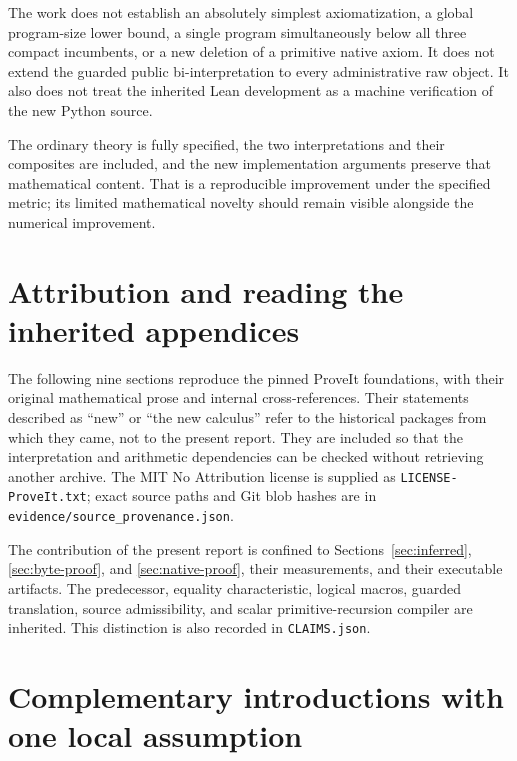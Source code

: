 \documentclass[11pt,letterpaper]{article}
\theoremstyle{definition}
\begin{document}
The work does not establish an absolutely simplest axiomatization,
a global program-size lower bound, a single program simultaneously below
all three compact incumbents, or a new deletion of a primitive native
axiom. It does not extend the guarded public bi-interpretation to every
administrative raw object. It also does not treat the inherited Lean
development as a machine verification of the new Python source.

The ordinary theory is fully specified, the two interpretations and their
composites are included, and the new implementation arguments preserve
that mathematical content. That is a reproducible improvement under the
specified metric; its limited mathematical novelty should remain visible
alongside the numerical improvement.

\clearpage
\appendix
\section{Attribution and reading the inherited appendices}

The following nine sections reproduce the pinned ProveIt foundations,
with their original mathematical prose and internal cross-references.
Their statements described as ``new'' or ``the new calculus'' refer to
the historical packages from which they came, not to the present report.
They are included so that the interpretation and arithmetic dependencies
can be checked without retrieving another archive. The MIT No Attribution
license is supplied as \texttt{LICENSE-ProveIt.txt}; exact source paths and
Git blob hashes are in \texttt{evidence/source\_provenance.json}.

The contribution of the present report is confined to
Sections~\ref{sec:inferred}, \ref{sec:byte-proof}, and
\ref{sec:native-proof}, their measurements, and their executable artifacts.
The predecessor, equality characteristic, logical macros, guarded
translation, source admissibility, and scalar primitive-recursion
compiler are inherited. This distinction is also recorded in
\texttt{CLAIMS.json}.


\section{Complementary introductions with one local assumption}
\label{sec:choice-introduction}
\end{document}
